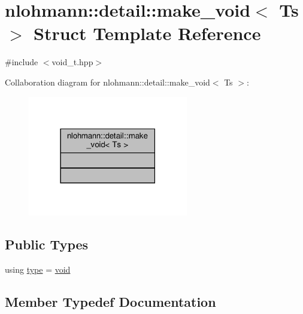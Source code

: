 \hypertarget{structnlohmann_1_1detail_1_1make__void}{}\section{nlohmann\+:\+:detail\+:\+:make\+\_\+void$<$ Ts $>$ Struct Template Reference}
\label{structnlohmann_1_1detail_1_1make__void}


{\ttfamily \#include $<$void\+\_\+t.\+hpp$>$}



Collaboration diagram for nlohmann\+:\+:detail\+:\+:make\+\_\+void$<$ Ts $>$\+:
\nopagebreak
\begin{figure}[H]
\begin{center}
\leavevmode
\includegraphics[width=198pt]{structnlohmann_1_1detail_1_1make__void__coll__graph}
\end{center}
\end{figure}
\subsection*{Public Types}
\begin{DoxyCompactItemize}
\item 
using \hyperlink{structnlohmann_1_1detail_1_1make__void_a8961e24ae3b2cb65ec47d1ce805d94e4}{type} = \hyperlink{namespacenlohmann_1_1detail_a59fca69799f6b9e366710cb9043aa77d}{void}
\end{DoxyCompactItemize}


\subsection{Member Typedef Documentation}
\mbox{\label{structnlohmann_1_1detail_1_1make__void_a8961e24ae3b2cb65ec47d1ce805d94e4}} 
